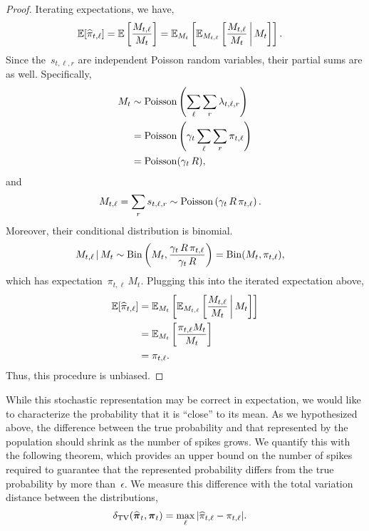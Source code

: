 \begin{proof}
  Iterating expectations, we have,
  \begin{align}
    \mathbb{E}[\widehat{\pi}_{t,\ell}] &=
    \mathbb{E} \left[ \frac{M_{t, \ell}}{M_{t}} \right] 
    = \mathbb{E}_{M_t} \left[
      \mathbb{E}_{M_{t,\ell}} \left[
        \frac{M_{t,\ell}}{M_t} \, \bigg|\,
        M_{t}  \right] \right].
  \end{align}
  Since the~$s_{t, \ell, r}$ are independent Poisson random variables, their partial
  sums are as well. Specifically,
  \begin{align}
    M_t &\sim \mathrm{Poisson} \left( \sum_{\ell} \sum_{r} \lambda_{t,\ell,r} \right) \\
    &= \mathrm{Poisson} \left(\gamma_t \sum_\ell \sum_r \pi_{t,\ell} \right) \\
    &= \mathrm{Poisson}(\gamma_t \, R),
  \end{align}
  and
  \begin{align}
        M_{t,\ell} = \sum_r s_{t, \ell, r} &\sim \mathrm{Poisson} \left( \gamma_t \, R \, \pi_{t, \ell} \right).
  \end{align}
  Moreover, their conditional distribution is binomial.
  \begin{align}
    M_{t,\ell} \,|\, M_t &\sim
    \mathrm{Bin} \left( M_t, \frac{\gamma_t \, R \, \pi_{t,\ell}}{\gamma_t \, R} \right)
    =\mathrm{Bin}(M_t, \pi_{t,\ell}),
  \end{align}
  which has expectation~$\pi_{t,\ell} \, M_t$.
  Plugging this into the iterated expectation above, 
  \begin{align}
    \mathbb{E}[\widehat{\pi}_{t,\ell}]
    &= \mathbb{E}_{M_t} \left[
      \mathbb{E}_{M_{t,\ell}} \left[
        \frac{M_{t,\ell}}{M_t} \, \bigg|\,
        M_t  \right] \right] \\
    &= \mathbb{E}_{M_t} \left[ 
      \frac{\pi_{t,\ell} M_t}{M_t} \right]\\
    &= \pi_{t,\ell}.
  \end{align}
  Thus, this procedure is unbiased.
\end{proof}

While this stochastic representation may be correct in expectation, we
would like to characterize the probability that it is ``close'' to its
mean. As we hypothesized above, the difference between the true
probability and that represented by the population should shrink as
the number of spikes grows. We quantify this with the following
theorem, which provides an upper bound on the number of spikes
required to guarantee that the represented probability differs from
the true probability by more than~$\epsilon$. We measure this
difference with the total variation distance between the
distributions,
\begin{align}
  \delta_{\mathrm{TV}}(\widehat{\boldsymbol{\pi}}_t, \boldsymbol{\pi}_t) &= 
  \max_{\ell} |\widehat{\pi}_{t,\ell} - \pi_{t,\ell}|.
\end{align}


